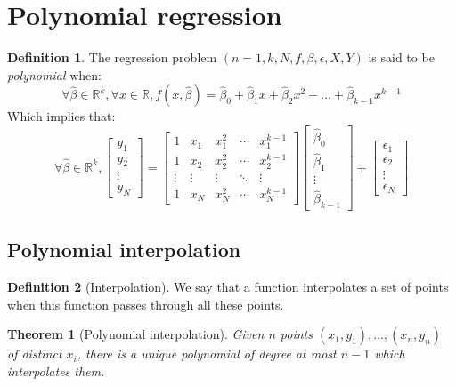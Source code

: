 \documentclass{article}
\newtheorem{theorem}{Theorem}[section]
\theoremstyle{definition}
\newtheorem{definition}{Definition}[section]
\theoremstyle{remark}
\theoremstyle{example}
\newcommand{\betat}{\hat{\beta}}
\newcommand{\fvector}[2]{\begin{bmatrix} #1_1 \\ #1_2 \\ \vdots \\ #1_{#2} \end{bmatrix}}
\begin{document}
\section{Polynomial regression}

\begin{definition}
		The regression problem $(n=1, k, N, f, \beta, \epsilon, X, Y)$ is said to be \textit{polynomial} when:
				$$\forall \betat \in \mathbb{R}^k, \forall x \in \mathbb{R}, f(x, \betat) = \betat_0 + \betat_1 x + \betat_2 x^2 + \dots + \betat_{k-1} x^{k-1}$$
		Which implies that:
		$$\forall \betat \in \mathbb{R}^k, \fvector{y}{N} = \begin{bmatrix} 1 & x_1 & x_1^2 & \cdots & x_1^{k-1} \\ 1 & x_2 & x_2^2 & \cdots & x_2^{k-1} \\ \vdots & \vdots & \vdots & \ddots & \vdots \\ 1 & x_N & x_N^2 & \cdots & x_N^{k-1} \end{bmatrix} \begin{bmatrix} \betat_0 \\ \betat_1 \\ \vdots \\ \betat_{k-1} \end{bmatrix} + \fvector{\epsilon}{N}$$
\end{definition}

\subsection{Polynomial interpolation}

\begin{definition}[Interpolation]
    We say that a function interpolates a set of points when this function passes through all these points.
\end{definition}

\begin{theorem}[Polynomial interpolation]
    Given $n$ points $(x_1, y_1), \dots, (x_n, y_n)$ of distinct $x_i$, there is a unique polynomial of degree at most $n-1$ which interpolates them.
\end{theorem}
\end{document}
